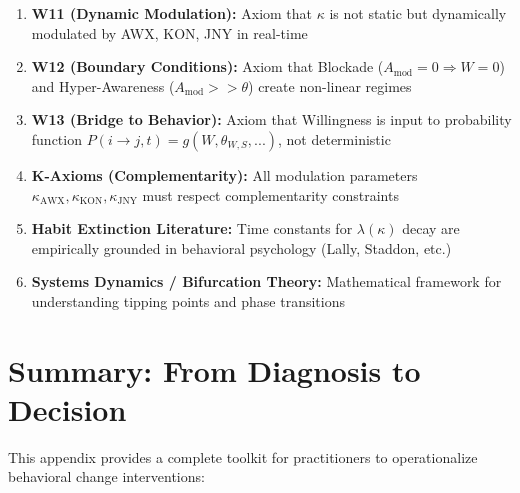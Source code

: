 \documentclass[11pt, a4paper]{article}
\begin{document}
\begin{enumerate}
    \item \textbf{W11 (Dynamic Modulation):} Axiom that $\kappa$ is not static but dynamically
    modulated by AWX, KON, JNY in real-time

    \item \textbf{W12 (Boundary Conditions):} Axiom that Blockade ($A_{\text{mod}} = 0 \Rightarrow W = 0$)
    and Hyper-Awareness ($A_{\text{mod}} >> \theta$) create non-linear regimes

    \item \textbf{W13 (Bridge to Behavior):} Axiom that Willingness is input to probability
    function $P(i \to j, t) = g(W, \theta_{W,S}, ...)$, not deterministic

    \item \textbf{K-Axioms (Complementarity):} All modulation parameters $\kappa_{\text{AWX}}, \kappa_{\text{KON}}, \kappa_{\text{JNY}}$
    must respect complementarity constraints

    \item \textbf{Habit Extinction Literature:} Time constants for $\lambda(\kappa)$ decay are
    empirically grounded in behavioral psychology (Lally, Staddon, etc.)

    \item \textbf{Systems Dynamics / Bifurcation Theory:} Mathematical framework for
    understanding tipping points and phase transitions
\end{enumerate}


\section{Summary: From Diagnosis to Decision}

This appendix provides a complete toolkit for practitioners to operationalize behavioral change interventions:
\end{document}
